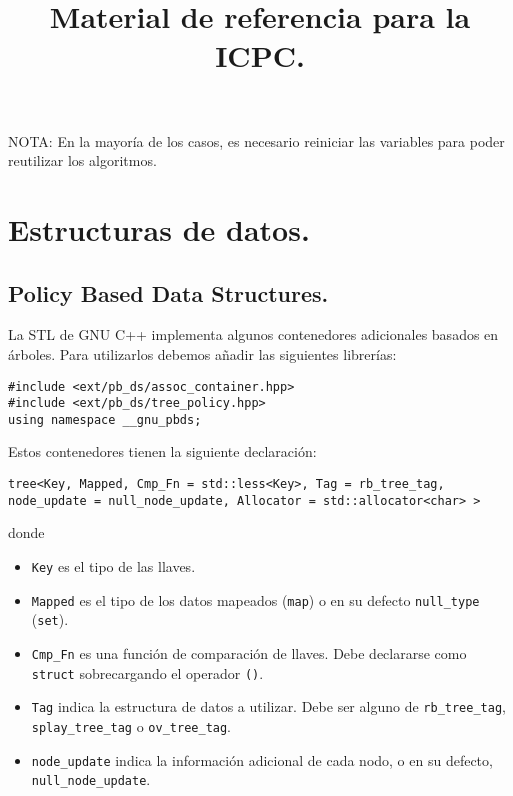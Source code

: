 \documentclass[10pt, letterpaper, twoside]{article}
\title{Material de referencia para la ICPC.}
\author{}
\date{}
\begin{document}
\maketitle

\tableofcontents

\bigskip

\noindent NOTA: En la mayoría de los casos, es necesario reiniciar las variables para poder reutilizar los algoritmos.

\newpage

\section{Estructuras de datos.}

\subsection{Policy Based Data Structures.}

La STL de GNU C++ implementa algunos contenedores adicionales basados en árboles. Para utilizarlos debemos añadir las siguientes librerías:

\begin{lstlisting}
#include <ext/pb_ds/assoc_container.hpp>
#include <ext/pb_ds/tree_policy.hpp>
using namespace __gnu_pbds;
\end{lstlisting}

Estos contenedores tienen la siguiente declaración:

\begin{lstlisting}
tree<Key, Mapped, Cmp_Fn = std::less<Key>, Tag = rb_tree_tag, node_update = null_node_update, Allocator = std::allocator<char> >
\end{lstlisting}

donde
\begin{itemize}
\item \texttt{Key} es el tipo de las llaves.

\item \texttt{Mapped} es el tipo de los datos mapeados (\texttt{map}) o en su defecto \texttt{null\_type} (\texttt{set}).

\item \texttt{Cmp\_Fn} es una función de comparación de llaves. Debe declararse como \texttt{struct} sobrecargando el operador \texttt{()}.

\item \texttt{Tag} indica la estructura de datos a utilizar. Debe ser alguno de \texttt{rb\_tree\_tag}, \texttt{splay\_tree\_tag} o \texttt{ov\_tree\_tag}.

\item \texttt{node\_update} indica la información adicional de cada nodo, o en su defecto, \texttt{null\_node\_update}.
\end{itemize}
\end{document}
